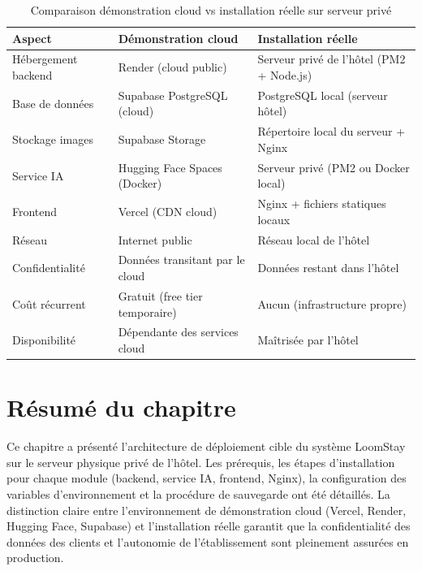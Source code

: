 \begin{table}[H]
\centering
\caption{Comparaison démonstration cloud vs installation réelle sur serveur privé}
\label{tab:comparaison_demo_prod}
\begin{tabular}{|p{3.5cm}|p{4.8cm}|p{4.8cm}|}
\hline
\textbf{Aspect} & \textbf{Démonstration cloud} & \textbf{Installation réelle} \\
\hline
Hébergement backend & Render (cloud public) & Serveur privé de l'hôtel (PM2 + Node.js) \\
\hline
Base de données & Supabase PostgreSQL (cloud) & PostgreSQL local (serveur hôtel) \\
\hline
Stockage images & Supabase Storage & Répertoire local du serveur + Nginx \\
\hline
Service IA & Hugging Face Spaces (Docker) & Serveur privé (PM2 ou Docker local) \\
\hline
Frontend & Vercel (CDN cloud) & Nginx + fichiers statiques locaux \\
\hline
Réseau & Internet public & Réseau local de l'hôtel \\
\hline
Confidentialité & Données transitant par le cloud & Données restant dans l'hôtel \\
\hline
Coût récurrent & Gratuit (free tier temporaire) & Aucun (infrastructure propre) \\
\hline
Disponibilité & Dépendante des services cloud & Maîtrisée par l'hôtel \\
\hline
\end{tabular}
\end{table}

\section*{Résumé du chapitre}

Ce chapitre a présenté l'architecture de déploiement cible du système LoomStay sur le serveur physique privé de l'hôtel. Les prérequis, les étapes d'installation pour chaque module (backend, service IA, frontend, Nginx), la configuration des variables d'environnement et la procédure de sauvegarde ont été détaillés. La distinction claire entre l'environnement de démonstration cloud (Vercel, Render, Hugging Face, Supabase) et l'installation réelle garantit que la confidentialité des données des clients et l'autonomie de l'établissement sont pleinement assurées en production.
